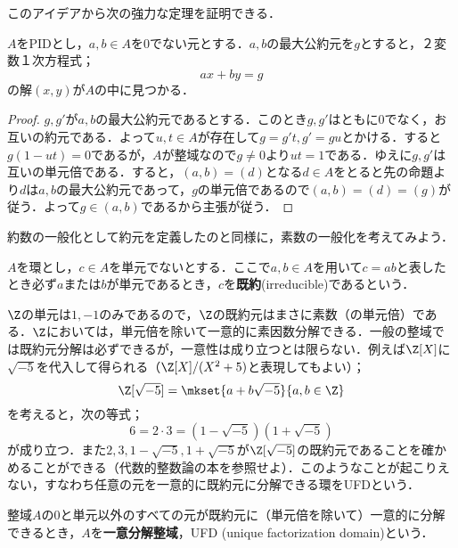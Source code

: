 このアイデアから次の強力な定理を証明できる．
\begin{thm}
	$A$をPIDとし，$a,b\in A$を0でない元とする．$a,b$の最大公約元を$g$とすると，２変数１次方程式；
	\[ax+by=g\]
	の解$(x,y)$が$A$の中に見つかる．
\end{thm}

\begin{proof}
	$g,g'$が$a,b$の最大公約元であるとする．このとき$g,g'$はともに0でなく，お互いの約元である．よって$u,t\in A$が存在して$g=g't,g'=gu$とかける．すると$g(1-ut)=0$であるが，$A$が整域なので$g\neq0$より$ut=1$である．ゆえに$g,g'$は互いの単元倍である．すると，$(a,b)=(d)$となる$d\in A$をとると先の命題より$d$は$a,b$の最大公約元であって，$g$の単元倍であるので$(a,b)=(d)=(g)$が従う．よって$g\in (a,b)$であるから主張が従う．
\end{proof}

約数の一般化として約元を定義したのと同様に，素数の一般化を考えてみよう．

\begin{defi}[既約元]\label{defi:既約元}
	$A$を環とし，$c\in A$を単元でないとする．ここで$a,b\in A$を用いて$c=ab$と表したとき必ず$a$または$b$が単元であるとき，$c$を\textbf{既約}(irreducible)であるという．
\end{defi}

$\Z$の単元は$1,-1$のみであるので，$\Z$の既約元はまさに素数（の単元倍）である．$\Z$においては，単元倍を除いて一意的に素因数分解できる．一般の整域では既約元分解は必ずできるが，一意性は成り立つとは限らない．例えば$\Z[X]$に$\sqrt{-5}$を代入して得られる（$\Z[X]/(X^2+5)$と表現してもよい）；
\[\Z[\sqrt{-5}]=\mkset{a+b\sqrt{-5}}{a,b\in\Z}\]
を考えると，次の等式；
\[6=2\cdot 3=(1-\sqrt{-5})(1+\sqrt{-5})\]
が成り立つ．また$2,3,1-\sqrt{-5},1+\sqrt{-5}$が$\Z[\sqrt{-5}]$の既約元であることを確かめることができる（代数的整数論の本を参照せよ）．このようなことが起こりえない，すなわち任意の元を一意的に既約元に分解できる環をUFDという．

\begin{defi}[UFD]
	整域$A$の$0$と単元以外のすべての元が既約元に（単元倍を除いて）一意的に分解できるとき，$A$を\textbf{一意分解整域}，UFD (unique factorization domain)という．
\end{defi}

